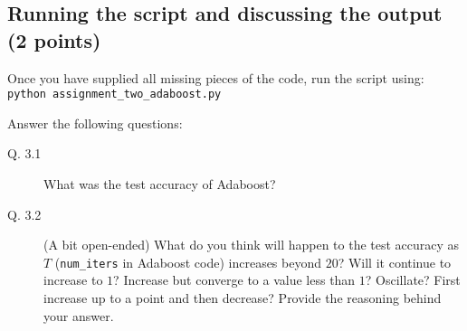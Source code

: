 \documentclass{article}
\begin{document}
\subsection{Running the script and discussing the output (2 points)}

Once you have supplied all missing pieces of the code, run the script using:\\
{\tt python assignment\_two\_adaboost.py}

Answer the following questions:
\begin{description}
\item[Q. 3.1]
What was the test accuracy of Adaboost?
\item[Q. 3.2]
(A bit open-ended) What do you think will happen to the test accuracy as $T$ ({\tt num\_iters} in Adaboost code) increases beyond $20$?
Will it continue to increase to $1$? Increase but converge to a value less than $1$? Oscillate? First increase up to a point
and then decrease? Provide the reasoning behind your answer.
\end{description}
\end{document}

